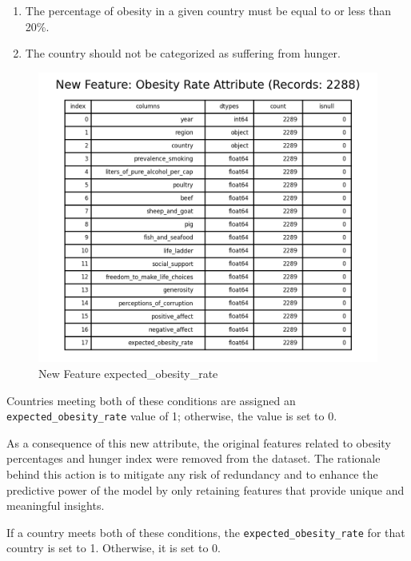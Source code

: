             \begin{enumerate}
                \item The percentage of obesity in a given country must be equal to or less than 20\%.
                \item The country should not be categorized as suffering from hunger.
            \end{enumerate}

            \begin{figure}[H]
                \centering
                \includegraphics[scale=1]{images/dp_new_feat_obes_rate_attribute}
                \caption{New Feature expected\_obesity\_rate}
                \label{fig:dp-new-feature}
            \end{figure}


            Countries meeting both of these conditions are assigned an \texttt{expected\_obesity\_rate} value of 1; otherwise, the value is set to 0.

            As a consequence of this new attribute, the original features related to obesity percentages and hunger index were removed from the dataset. The rationale behind this action is to mitigate any risk of redundancy and to enhance the predictive power of the model by only retaining features that provide unique and meaningful insights.

            If a country meets both of these conditions, the \texttt{expected\_obesity\_rate} for that country is set to 1. Otherwise, it is set to 0.

